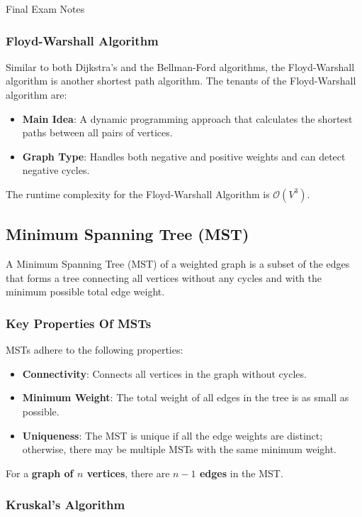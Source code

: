\begin{examnotes}{Final Exam Notes}
    \subsubsection*{Floyd-Warshall Algorithm}

    Similar to both Dijkstra's and the Bellman-Ford algorithms, the Floyd-Warshall algorithm is another shortest path algorithm. The tenants of the Floyd-Warshall algorithm are:

    \begin{itemize}
        \item \textbf{Main Idea}: A dynamic programming approach that calculates the shortest paths between all pairs of vertices.
        \item \textbf{Graph Type}: Handles both negative and positive weights and can detect negative cycles.
    \end{itemize}
    The runtime complexity for the Floyd-Warshall Algorithm is $\mathcal{O}(V^{3})$.

    \subsection*{Minimum Spanning Tree (MST)}

    A Minimum Spanning Tree (MST) of a weighted graph is a subset of the edges that forms a tree connecting all vertices without any cycles and with the minimum possible total edge weight.

    \subsubsection*{Key Properties Of MSTs}

    MSTs adhere to the following properties:

    \begin{itemize}
        \item \textbf{Connectivity}: Connects all vertices in the graph without cycles.
        \item \textbf{Minimum Weight}: The total weight of all edges in the tree is as small as possible.
        \item \textbf{Uniqueness}: The MST is unique if all the edge weights are distinct; otherwise, there may be multiple MSTs with the same minimum weight.
    \end{itemize}
    For a \textbf{graph of $n$ vertices}, there are \textbf{$n - 1$ edges} in the MST.

    \subsubsection*{Kruskal's Algorithm}


\end{examnotes}
